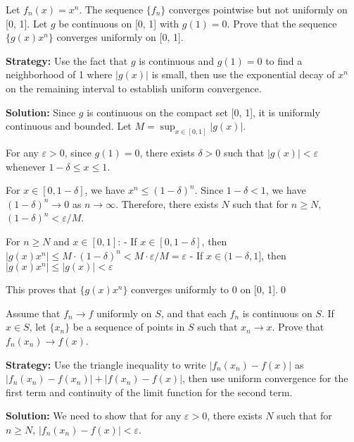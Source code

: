 \begin{problembox}
Let \( f_n(x) = x^n \). The sequence \( \{f_n\} \) converges pointwise but not uniformly on [0, 1]. Let \( g \) be continuous on [0, 1] with \( g(1) = 0 \). Prove that the sequence \( \{g(x)x^n\} \) converges uniformly on [0, 1].
\end{problembox}

\noindent\textbf{Strategy:} Use the fact that \( g \) is continuous and \( g(1) = 0 \) to find a neighborhood of 1 where \( |g(x)| \) is small, then use the exponential decay of \( x^n \) on the remaining interval to establish uniform convergence.

\bigskip\noindent\textbf{Solution:} Since \( g \) is continuous on the compact set [0, 1], it is uniformly continuous and bounded. Let \( M = \sup_{x \in [0,1]} |g(x)| \).

For any \( \varepsilon > 0 \), since \( g(1) = 0 \), there exists \( \delta > 0 \) such that \( |g(x)| < \varepsilon \) whenever \( 1 - \delta \leq x \leq 1 \).

For \( x \in [0, 1 - \delta] \), we have \( x^n \leq (1 - \delta)^n \). Since \( 1 - \delta < 1 \), we have \( (1 - \delta)^n \to 0 \) as \( n \to \infty \). Therefore, there exists \( N \) such that for \( n \geq N \), \( (1 - \delta)^n < \varepsilon/M \).

For \( n \geq N \) and \( x \in [0, 1] \):
- If \( x \in [0, 1 - \delta] \), then \( |g(x)x^n| \leq M \cdot (1 - \delta)^n < M \cdot \varepsilon/M = \varepsilon \)
- If \( x \in (1 - \delta, 1] \), then \( |g(x)x^n| \leq |g(x)| < \varepsilon \)

This proves that \( \{g(x)x^n\} \) converges uniformly to 0 on [0, 1].\qed


\begin{problembox}
Assume that \( f_n \to f \) uniformly on \( S \), and that each \( f_n \) is continuous on \( S \). If \( x \in S \), let \( \{x_n\} \) be a sequence of points in \( S \) such that \( x_n \to x \). Prove that \( f_n(x_n) \to f(x) \).
\end{problembox}

\noindent\textbf{Strategy:} Use the triangle inequality to write \( |f_n(x_n) - f(x)| \) as \( |f_n(x_n) - f(x_n)| + |f(x_n) - f(x)| \), then use uniform convergence for the first term and continuity of the limit function for the second term.

\bigskip\noindent\textbf{Solution:} We need to show that for any \( \varepsilon > 0 \), there exists \( N \) such that for \( n \geq N \), \( |f_n(x_n) - f(x)| < \varepsilon \).

